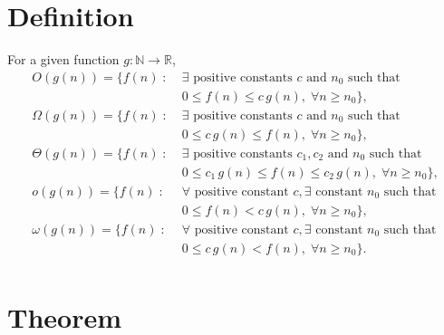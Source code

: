 \documentclass[12pt]{article}
\begin{document}
\section*{Definition}

For a given function \(g : \mathbb{N} \to \mathbb{R}\),
\begin{align*} 
    O(g(n)) = \{ f(n) \; : \; & \exists \text{ positive constants } c \text{ and } n_0 \text{ such that} \\
    & 0 \leq f(n) \leq c \, g(n), \; \forall n \geq n_0 \}, \\
    \Omega(g(n)) = \{ f(n) \; : \; & \exists \text{ positive constants } c \text{ and } n_0 \text{ such that} \\
    & 0 \leq c \, g(n) \leq f(n), \; \forall n \geq n_0 \}, \\
    \Theta(g(n)) = \{ f(n) \; : \; & \exists \text{ positive constants } c_1, c_2 \text{ and } n_0 \text{ such that} \\
    & 0 \leq c_1 \, g(n) \leq f(n) \leq c_2 \, g(n), \; \forall n \geq n_0 \}, \\
    o(g(n)) = \{ f(n) \; : \; & \forall \text{ positive constant } c, \exists \text{ constant } n_0 \text{ such that} \\
    & 0 \leq f(n) < c \, g(n), \; \forall n \geq n_0 \}, \\
    \omega(g(n)) = \{ f(n) \; : \; & \forall \text{ positive constant } c, \exists \text{ constant } n_0 \text{ such that} \\
    & 0 \leq c \, g(n) < f(n), \; \forall n \geq n_0 \}. \\
\end{align*}

\section*{Theorem}
\end{document}
